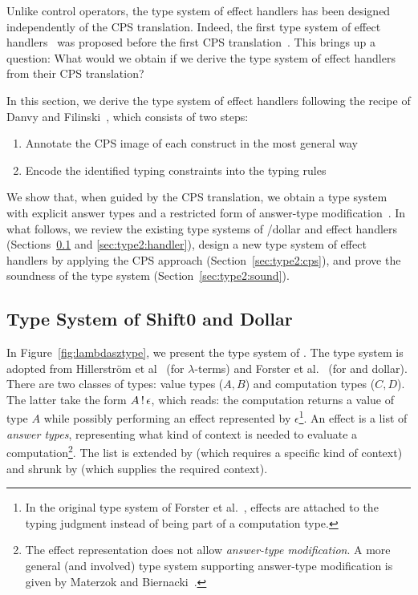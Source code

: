 Unlike control operators, the type system of effect handlers has been
designed independently of the CPS translation.
Indeed, the first type system of effect handlers~\cite{bauer-effsys} was
proposed before the first CPS translation~\cite{hillerstrom-cps}.
This brings up a question: What would we obtain if we derive the type system
of effect handlers from their CPS translation?

In this section, we derive the type system of effect handlers following
the recipe of Danvy and Filinski~\cite{danvy-context}, which consists of
two steps:

\begin{enumerate}
\item Annotate the CPS image of each construct in the most general way
\item Encode the identified typing constraints into the typing rules
\end{enumerate}

\noindent We show that, when guided by the CPS translation, we obtain a
type system with explicit answer types and a restricted form of
answer-type modification~\cite{danvy-context}.
In what follows, we review the existing type systems of \shiftztt/dollar
and effect handlers (Sections~\ref{sec:type2:shiftz} and
\ref{sec:type2:handler}), design a new type system of effect handlers by
applying the CPS approach (Section~\ref{sec:type2:cps}), and prove the
soundness of the type system (Section~\ref{sec:type2:sound}).


\subsection{Type System of Shift0 and Dollar}
\label{sec:type2:shiftz}

In Figure~\ref{fig:lambdasztype}, we present the type system of \lambdasz.
The type system is adopted from Hillerstr\"om et al~\cite{hillerstrom-cps}
(for $\lambda$-terms) and Forster et al.~\cite{forster-jfp} (for \shiftztt
and dollar).
There are two classes of types: value types ($A, B$) and computation types
($C, D$).
The latter take the form $A \, ! \, \epsilon$, which reads: the computation
returns a value of type $A$ while possibly performing an effect represented
by $\epsilon$\footnote{In the original type system of Forster et
al.~\cite{forster-jfp}, effects are attached to the typing judgment
instead of being part of a computation type.}.
An effect is a list of \textit{answer types}, representing what kind of
context is needed to evaluate a computation\footnote{The effect
representation does not allow \textit{answer-type modification}.
A more general (and involved) type system supporting answer-type
modification is given by Materzok and Biernacki~\cite{materzok-hierarchy}.}.
The list is extended by  (which requires a specific kind
of context) and shrunk by  (which supplies the required
context).

